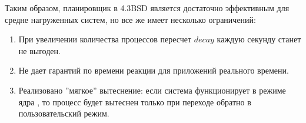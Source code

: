 Таким образом, планировщик в 4.3BSD является достаточно эффективным для средне нагруженных систем, но все же имеет несколько ограничений:
\begin{enumerate}[label=---]
\item При увеличении количества процессов пересчет $decay$ каждую секунду станет не выгоден.
\item Не дает гарантий по времени реакции для приложений реального времени.
\item Реализовано ''мягкое'' вытеснение: если система функционирует в режиме ядра , то процесс будет вытеснен только при переходе обратно в пользовательский режим.
\end{enumerate} 
